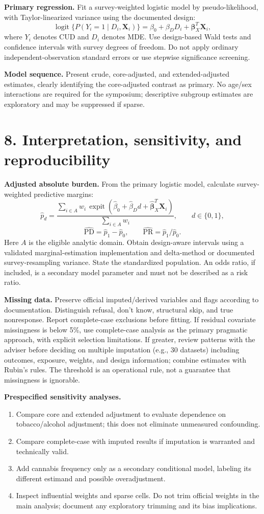 \documentclass[10pt]{article}
\newcommand{\head}[1]{\section*{\color{navy}#1}}
\begin{document}
\textbf{Primary regression.} Fit a survey-weighted logistic model by pseudo-likelihood, with Taylor-linearized variance using the documented design:
\[
\operatorname{logit}\{P(Y_i=1\mid D_i,\mathbf X_i)\}
=\beta_0+\beta_D D_i+\boldsymbol\beta_X^T\mathbf X_i,
\]
where $Y_i$ denotes CUD and $D_i$ denotes MDE. Use design-based Wald tests and confidence intervals with survey degrees of freedom. Do not apply ordinary independent-observation standard errors or use stepwise significance screening.

\textbf{Model sequence.} Present crude, core-adjusted, and extended-adjusted estimates, clearly identifying the core-adjusted contrast as primary. No age/sex interactions are required for the symposium; descriptive subgroup estimates are exploratory and may be suppressed if sparse.
\newpage
\head{8. Interpretation, sensitivity, and reproducibility}
\textbf{Adjusted absolute burden.} From the primary logistic model, calculate survey-weighted predictive margins:
\[
\widehat p_d=\frac{\sum_{i\in A}w_i\,\operatorname{expit}
(\widehat\beta_0+\widehat\beta_Dd+\widehat{\boldsymbol\beta}_X^T\mathbf X_i)}
{\sum_{i\in A}w_i},\qquad d\in\{0,1\},
\]
\[
\widehat{\mathrm{PD}}=\widehat p_1-\widehat p_0,\qquad
\widehat{\mathrm{PR}}=\widehat p_1/\widehat p_0.
\]
Here $A$ is the eligible analytic domain. Obtain design-aware intervals using a validated marginal-estimation implementation and delta-method or documented survey-resampling variance. State the standardized population. An odds ratio, if included, is a secondary model parameter and must not be described as a risk ratio.

\textbf{Missing data.} Preserve official imputed/derived variables and flags according to documentation. Distinguish refusal, don't know, structural skip, and true nonresponse. Report complete-case exclusions before fitting. If residual covariate missingness is below 5\%, use complete-case analysis as the primary pragmatic approach, with explicit selection limitations. If greater, review patterns with the adviser before deciding on multiple imputation (e.g., 30 datasets) including outcomes, exposure, weights, and design information; combine estimates with Rubin's rules. The threshold is an operational rule, not a guarantee that missingness is ignorable.

\textbf{Prespecified sensitivity analyses.}
\begin{enumerate}
\item Compare core and extended adjustment to evaluate dependence on tobacco/alcohol adjustment; this does not eliminate unmeasured confounding.
\item Compare complete-case with imputed results if imputation is warranted and technically valid.
\item Add cannabis frequency only as a secondary conditional model, labeling its different estimand and possible overadjustment.
\item Inspect influential weights and sparse cells. Do not trim official weights in the main analysis; document any exploratory trimming and its bias implications.
\end{enumerate}
\end{document}

